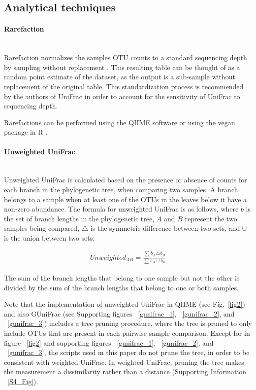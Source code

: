 \documentclass[10pt,letterpaper]{article}
\begin{document}
\subsection{Analytical techniques}

\paragraph{Rarefaction}\mbox{}\\
Rarefaction normalizes the samples OTU counts to a standard sequencing depth by sampling without replacement \cite{simberloff1978use}. This resulting table can be thought of as a random point estimate of the dataset, as the output is a sub-sample without replacement of the original table. This standardization process is recommended by the authors of UniFrac \cite{de2011evaluation} in order to account for the sensitivity of UniFrac to sequencing depth.

Rarefactions can be performed using the QIIME software \cite{caporaso2010qiime} or using the vegan package in R \cite{oksanen2007vegan}.

\paragraph{Unweighted UniFrac}\mbox{}\\
Unweighted UniFrac is calculated based on the presence or absence of counts for each branch in the phylogenetic tree, when comparing two samples. A branch belongs to a sample when at least one of the OTUs in the leaves below it have a non-zero abundance. The formula for unweighted UniFrac is as follows, where $b$ is the set of branch lengths in the phylogenetic tree, $A$ and $B$ represent the two samples being compared, $\triangle$ is the symmetric difference between two sets, and $\cup$ is the union between two sets:

\begin{align*}
Unweighted_{AB} = \frac{\sum_{}{} b_{A} \triangle b_{B}}{\sum_{}{} b_{A} \cup b_{B}}
\end{align*}

The sum of the branch lengths that belong to one sample but not the other is divided by the sum of the branch lengths that belong to one or both samples.

Note that the implementation of unweighted UniFrac in QIIME (see Fig.~\ref{fig2}) and also GUniFrac (see Supporting figures ~\ref{gunifrac_1}, ~\ref{gunifrac_2}, and ~\ref{gunifrac_3}) includes a tree pruning procedure, where the tree is pruned to only include OTUs that are present in each pairwise sample comparison. Except for in figure ~\ref{fig2} and supporting figures ~\ref{gunifrac_1}, ~\ref{gunifrac_2}, and ~\ref{gunifrac_3}, the scripts used in this paper do not prune the tree, in order to be consistent with weighted UniFrac. In weighted UniFrac, pruning the tree makes the measurement a dissimilarity rather than a distance (Supporting Information ~\ref{S4_Fig}).
\end{document}
